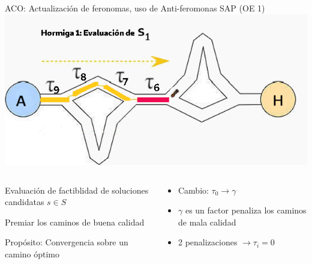 \begin{frame}{ACO: Actualizaci\'on de feronomas, uso de Anti-feromonas SAP (OE 1)}
    \centering
    \includegraphics[scale=0.4]{Pictures/ACO-ant-ferom-penalize.png}
    \begin{columns}
        \begin{column}{0.5\textwidth}
            \item Evaluaci\'on de factiblidad de soluciones candidatas $s \in S$
            \item Premiar los caminos de buena calidad
            \item Prop\'osito: Convergencia sobre un camino \'optimo
        \end{column}
        \begin{column}{0.5\textwidth}
            \begin{itemize}
                \item Cambio: $\tau_0 \longrightarrow \gamma$
                \item $\gamma$ es un factor penaliza los caminos de mala calidad
                \item 2 penalizaciones $\longrightarrow \tau_i = 0$ 
            \end{itemize}
        \end{column}
    \end{columns}
    
\end{frame}

